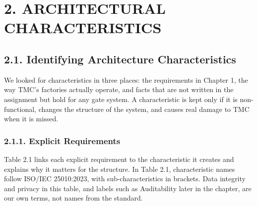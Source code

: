 \section*{2. ARCHITECTURAL CHARACTERISTICS}

{}

\subsection*{2.1. Identifying Architecture Characteristics}

{}

We looked for characteristics in three places: the requirements in Chapter 1, the way TMC's factories actually operate, and facts that are not written in the assignment but hold for any gate system. A characteristic is kept only if it is non-functional, changes the structure of the system, and causes real damage to TMC when it is missed.

\subsubsection*{2.1.1. Explicit Requirements}

{}


Table 2.1 links each explicit requirement to the characteristic it creates and explains why it matters for the structure. In Table 2.1, characteristic names follow ISO/IEC 25010:2023, with sub-characteristics in brackets. Data integrity and privacy in this table, and labels such as Auditability later in the chapter, are our own terms, not names from the standard.

